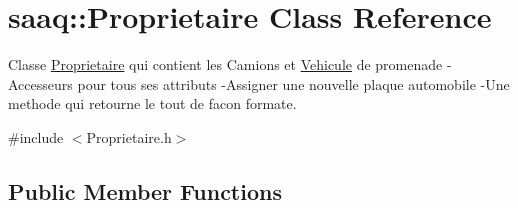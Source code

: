 \hypertarget{classsaaq_1_1Proprietaire}{}\section{saaq\+:\+:Proprietaire Class Reference}
\label{classsaaq_1_1Proprietaire}


Classe \hyperlink{classsaaq_1_1Proprietaire}{Proprietaire} qui contient les Camions et \hyperlink{classsaaq_1_1Vehicule}{Vehicule} de promenade -\/\+Accesseurs pour tous ses attributs -\/\+Assigner une nouvelle plaque automobile -\/\+Une methode qui retourne le tout de facon formate.  




{\ttfamily \#include $<$Proprietaire.\+h$>$}

\subsection*{Public Member Functions}
